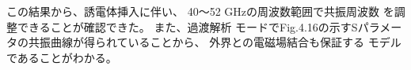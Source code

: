この結果から、誘電体挿入に伴い、
40〜52 GHzの周波数範囲で共振周波数
を調整できることが確認できた。
また、過渡解析
モードでFig.4.16の示すSパラメータの共振曲線が得られていることから、
外界との電磁場結合も保証する
モデルであることがわかる。


%
%
%
%
%
